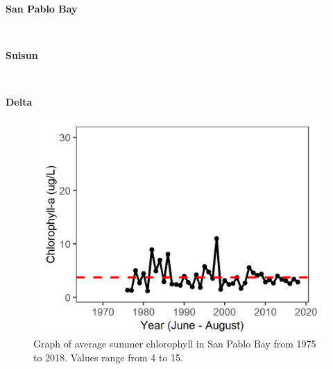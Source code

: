 \documentclass[
]{book}
\begin{document}
\begin{panel-grid}

\begin{columns-nocenter}

\begin{column800}

\textbf{San Pablo Bay}

\end{column800}

\begin{column40}

~

\end{column40}

\begin{column800}

\textbf{Suisun}

\end{column800}

\begin{column40}

~

\end{column40}

\begin{column800}

\textbf{Delta}

\end{column800}

\end{columns-nocenter}

\begin{columns-nocenter}

\begin{column800}

\begin{expand}

\begin{figure}
\includegraphics[width=15.25in]{figures/chla_splsummer} \caption{Graph of average summer chlorophyll in San Pablo Bay from 1975 to 2018. Values range from 4 to 15.}\label{fig:unnamed-chunk-63}
\end{figure}


\end{expand}
\end{column800}
\end{columns-nocenter}
\end{panel-grid}
\end{document}
